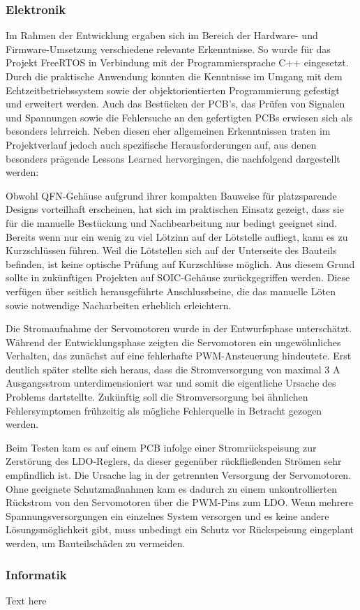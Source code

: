 \documentclass[main.tex]{subfiles} %
\begin{document}
\subsubsection{Elektronik}
Im Rahmen der Entwicklung ergaben sich im Bereich der Hardware- und Firmware-Umsetzung verschiedene relevante
Erkenntnisse. So wurde für das Projekt FreeRTOS in Verbindung mit der Programmiersprache C++ eingesetzt. Durch
die praktische Anwendung konnten die Kenntnisse im Umgang mit dem Echtzeitbetriebssystem sowie der objektorientierten
Programmierung gefestigt und erweitert werden. Auch das Bestücken der PCB's, das Prüfen von Signalen
und Spannungen sowie die Fehlersuche an den gefertigten PCBs erwiesen sich als besonders lehrreich.
Neben diesen eher allgemeinen Erkenntnissen traten im Projektverlauf jedoch auch spezifische Herausforderungen auf,
aus denen besonders prägende Lessons Learned hervorgingen, die nachfolgend dargestellt werden:

Obwohl QFN-Gehäuse aufgrund ihrer kompakten Bauweise für platzsparende Designs
vorteilhaft erscheinen, hat sich im praktischen Einsatz gezeigt, dass sie für die manuelle Bestückung
und Nachbearbeitung nur bedingt geeignet sind. Bereits wenn nur ein wenig zu viel Lötzinn auf der
Lötstelle aufliegt, kann es zu Kurzschlüssen führen. Weil die Lötstellen sich auf der Unterseite des
Bauteils befinden, ist keine optische Prüfung auf Kurzschlüsse möglich. Aus diesem Grund sollte in
zukünftigen Projekten auf SOIC-Gehäuse zurückgegriffen werden. Diese verfügen über
seitlich herausgeführte Anschlussbeine, die das manuelle Löten sowie
notwendige Nacharbeiten erheblich erleichtern.

Die Stromaufnahme der Servomotoren wurde in der Entwurfsphase unterschätzt.
Während der Entwicklungsphase zeigten die Servomotoren ein ungewöhnliches Verhalten, das zunächst auf eine
fehlerhafte PWM-Ansteuerung hindeutete. Erst deutlich später stellte sich heraus, dass die Stromversorgung von
maximal 3 A Ausgangsstrom unterdimensioniert war und somit die eigentliche Ursache des Problems dartstellte.
Zukünftig soll die Stromversorgung bei ähnlichen Fehlersymptomen frühzeitig als mögliche Fehlerquelle in Betracht
gezogen werden.

Beim Testen kam es auf einem PCB infolge einer Stromrückspeisung zur Zerstörung des LDO-Reglers, da dieser gegenüber
rückfließenden Strömen sehr empfindlich ist. Die Ursache lag in der getrennten Versorgung der Servomotoren. 
Ohne geeignete Schutzmaßnahmen kam es dadurch zu einem unkontrollierten Rückstrom von den Servomotoren über die
PWM-Pins zum LDO. Wenn mehrere Spannungsversorgungen ein einzelnes System versorgen und es keine andere
Lösungsmöglichkeit gibt, muss unbedingt ein Schutz vor Rückspeisung eingeplant werden, um Bauteilschäden zu vermeiden.



\subsubsection{Informatik}

Text here
\end{document}
